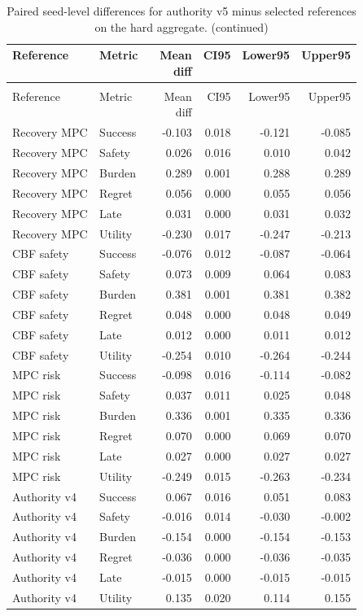 \documentclass{article}
\begin{document}
\begin{center}
\scriptsize
\begin{longtable}{p{0.30\linewidth}p{0.20\linewidth}rrrr}
\caption{Paired seed-level differences for authority v5 minus selected references on the hard aggregate.}\label{tab:paired}\\
\toprule
Reference & Metric & Mean diff & CI95 & Lower95 & Upper95\\
\midrule
\endfirsthead
\caption[]{Paired seed-level differences for authority v5 minus selected references on the hard aggregate. (continued)}\\
\toprule
Reference & Metric & Mean diff & CI95 & Lower95 & Upper95\\
\midrule
\endhead
Recovery MPC & Success & -0.103 & 0.018 & -0.121 & -0.085\\
Recovery MPC & Safety & 0.026 & 0.016 & 0.010 & 0.042\\
Recovery MPC & Burden & 0.289 & 0.001 & 0.288 & 0.289\\
Recovery MPC & Regret & 0.056 & 0.000 & 0.055 & 0.056\\
Recovery MPC & Late & 0.031 & 0.000 & 0.031 & 0.032\\
Recovery MPC & Utility & -0.230 & 0.017 & -0.247 & -0.213\\
CBF safety & Success & -0.076 & 0.012 & -0.087 & -0.064\\
CBF safety & Safety & 0.073 & 0.009 & 0.064 & 0.083\\
CBF safety & Burden & 0.381 & 0.001 & 0.381 & 0.382\\
CBF safety & Regret & 0.048 & 0.000 & 0.048 & 0.049\\
CBF safety & Late & 0.012 & 0.000 & 0.011 & 0.012\\
CBF safety & Utility & -0.254 & 0.010 & -0.264 & -0.244\\
MPC risk & Success & -0.098 & 0.016 & -0.114 & -0.082\\
MPC risk & Safety & 0.037 & 0.011 & 0.025 & 0.048\\
MPC risk & Burden & 0.336 & 0.001 & 0.335 & 0.336\\
MPC risk & Regret & 0.070 & 0.000 & 0.069 & 0.070\\
MPC risk & Late & 0.027 & 0.000 & 0.027 & 0.027\\
MPC risk & Utility & -0.249 & 0.015 & -0.263 & -0.234\\
Authority v4 & Success & 0.067 & 0.016 & 0.051 & 0.083\\
Authority v4 & Safety & -0.016 & 0.014 & -0.030 & -0.002\\
Authority v4 & Burden & -0.154 & 0.000 & -0.154 & -0.153\\
Authority v4 & Regret & -0.036 & 0.000 & -0.036 & -0.035\\
Authority v4 & Late & -0.015 & 0.000 & -0.015 & -0.015\\
Authority v4 & Utility & 0.135 & 0.020 & 0.114 & 0.155\\
\bottomrule
\end{longtable}
\normalsize
\end{center}
\end{document}
